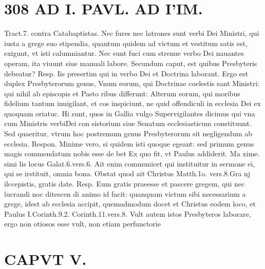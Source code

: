 \documentclass{article}
\begin{document}
\begin{pages}
\section*{308 AD I. PAVL. AD I'IM. }\pstart Tract.7. contra Catabaptistas. Nec fures nec latrones sunt verbi Dei Ministri, qui iusta a grege suo stipendia, quantum quidem ad victum et vestitum satis est, exigunt, vt isti calumniantur. Nec sunt fuci cum strenue verbo Dei nauantes operam, ita viuunt siue manuali labore. Secundum caput, est quibus Presbyteris debeatur? Resp. Iis presertim qui in verbo Dei et Doctrina laborant. Ergo est duplex Presbyterorum genus, Vnum eorum, qui Doctrinae coelestis sant Ministri: qui nihil ab episcopis et Pasto ribus differunt: Alterum eorum, qui moribus fidelium tantum inuigilant, et cos inspiciunt, ne quid offendiculi in ecclesia Dei ex quoquam oriatuc. Hi sunt, quos in Gallia vulgo Supervigilantes dicimus qui vna cum Ministris verbiDei con sistorium siue Senatum ecclesiasticum constituunt. Sed quaeritur, vtrum hoc postremum genus Presbyterorum sit negligendum ab ecclesia. Respon. Minime vero, si quidem isti quoque egeant: sed primum genus magis commendatum nobis esse de bet Ex quo fit, vt Paulus addiderit. Ma xime. simi lis locus Galat.6.vers.6. Ait enim communicet qui instituitur in sermone ei, qui se irstituit, omnia bona. Obstat quod ait Christus Matth.1o. vers.8.Gra nj ilccepistis, gratis date. Resp. Eum gratis praeesse et pascere gregem, qui nec lucrandi noc ditescen di animo id facit: quanquam victum sibi necessarium a grege, idest ab ecclesia accipit, quemadmodum docet et Christus eodem loco, et Paulus I.Corinth.9.2. Corinth.11.vers.8. Vult autem istos Presbyteros laborare, ergo non otiosos esse vult, non etiam perfunctorie  \pend
\section*{CAPVT  V. }
\marginpar{[ p.309 ]}\pstart {}
{}

\end{pages}
\end{document}
